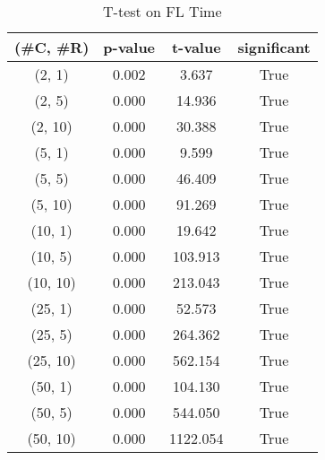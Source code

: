 \begin{table}[h]
\centering
\caption{T-test on FL Time}
\label{tab:t-testFL}
\begin{tabular}{|c|c|c|c|}
\toprule
(\#C, \#R) &  p-value &  t-value &  significant \\
\midrule
  (2, 1) &    0.002 &    3.637 &         True \\
  (2, 5) &    0.000 &   14.936 &         True \\
 (2, 10) &    0.000 &   30.388 &         True \\
  (5, 1) &    0.000 &    9.599 &         True \\
  (5, 5) &    0.000 &   46.409 &         True \\
 (5, 10) &    0.000 &   91.269 &         True \\
 (10, 1) &    0.000 &   19.642 &         True \\
 (10, 5) &    0.000 &  103.913 &         True \\
(10, 10) &    0.000 &  213.043 &         True \\
 (25, 1) &    0.000 &   52.573 &         True \\
 (25, 5) &    0.000 &  264.362 &         True \\
(25, 10) &    0.000 &  562.154 &         True \\
 (50, 1) &    0.000 &  104.130 &         True \\
 (50, 5) &    0.000 &  544.050 &         True \\
(50, 10) &    0.000 & 1122.054 &         True \\
\bottomrule
\end{tabular}
\end{table}
